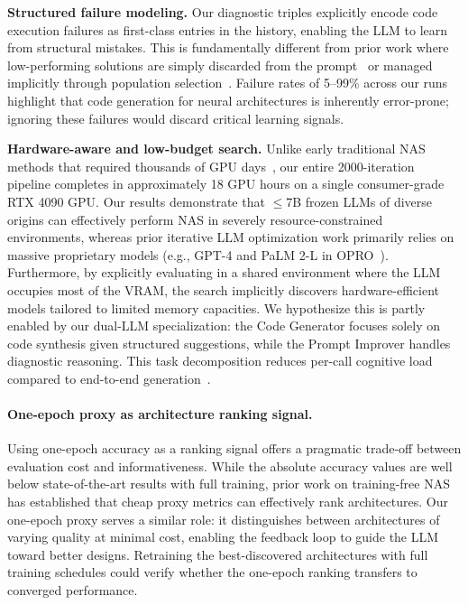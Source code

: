 \documentclass[10pt,twocolumn,letterpaper]{article}
\begin{document}
	\textbf{Structured failure modeling.} Our diagnostic triples explicitly encode 
	code execution failures as first-class entries in the history, enabling 
	the LLM to learn from structural mistakes. This is fundamentally different from 
	prior work where low-performing solutions are simply discarded from the prompt~\cite{Yang2023OPRO,Romera2023FunSearch} 
	or managed implicitly through population selection~\cite{Chen2023EvoPrompting}. 
	Failure rates of 5--99\% across our runs highlight that code generation for neural architectures is inherently 
	error-prone; ignoring these failures would discard critical learning signals.
	
	\textbf{Hardware-aware and low-budget search.} Unlike early traditional NAS methods that required thousands of GPU days~\cite{Zoph2017,Real2019}, our entire 2000-iteration pipeline completes in approximately 18 GPU hours on a single consumer-grade RTX 4090 GPU. Our results demonstrate that $\leq$7B frozen LLMs of diverse origins can effectively perform NAS in severely resource-constrained environments, whereas prior iterative LLM optimization work primarily relies on massive proprietary models (e.g., GPT-4 and PaLM 2-L in OPRO~\cite{Yang2023OPRO}). Furthermore, by explicitly evaluating in a shared environment where the LLM occupies most of the VRAM, the search implicitly discovers hardware-efficient models tailored to limited memory capacities. We hypothesize this is partly enabled 
	by our dual-LLM specialization: the Code Generator focuses solely on code synthesis 
	given structured suggestions, while the Prompt Improver handles diagnostic reasoning. 
	This task decomposition reduces per-call cognitive load compared to end-to-end 
	generation~\cite{Chen2023EvoPrompting}.
	
	
	\paragraph{One-epoch proxy as architecture ranking signal.}
	Using one-epoch accuracy as a ranking signal offers a pragmatic trade-off between evaluation cost and informativeness. While the absolute accuracy values are well below state-of-the-art results with full training, prior work on training-free NAS~\cite{Mellor2021,Li2024ZeroShot} has established that cheap proxy metrics can effectively rank architectures. Our one-epoch proxy serves a similar role: it distinguishes between architectures of varying quality at minimal cost, enabling the feedback loop to guide the LLM toward better designs. Retraining the best-discovered architectures with full training schedules could verify whether the one-epoch ranking transfers to converged performance.
	
\end{document}
